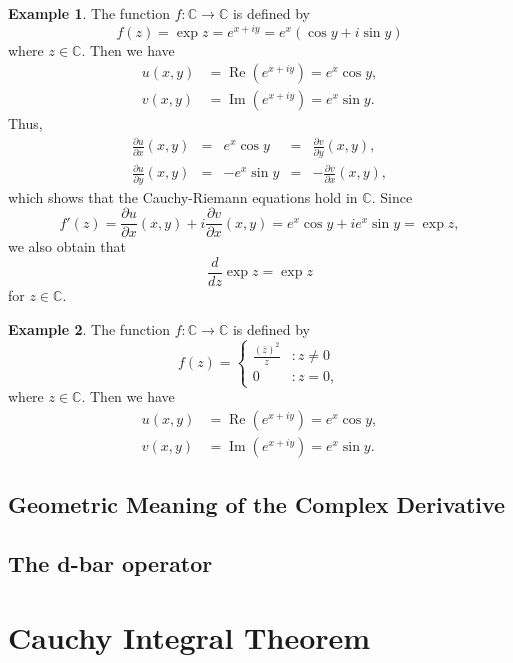 \documentclass[12pt,openany]{book}
\theoremstyle{definition}
\newtheorem{example}{Example}[section]
\newcommand{\C}{\mathbb{C}}
\newcommand{\of}[1]{\left( #1 \right)}
\renewcommand{\Re}{\operatorname{Re}}
\renewcommand{\Im}{\operatorname{Im}}
\begin{document}
	\newpage
	\begin{example}
		The function $f:\C\to\C$ is defined by \[
		f\of{z}=\exp z=e^{x+iy}=e^x\of{\cos y+i\sin y}
		\] where $z\in\C$. Then we have \begin{align*}
		u(x,y)&=\Re\of{e^{x+iy}}=e^x\cos y,\\
		v(x,y)&=\Im\of{e^{x+iy}}=e^x\sin y.
		\end{align*} Thus, \begin{align*}
		\frac{\partial u}{\partial x}\of{x,y} &=& e^x\cos y &=& \frac{\partial v}{\partial y}\of{x,y},\\
		\frac{\partial u}{\partial y}\of{x,y} &=& -e^x\sin y &=& -\frac{\partial v}{\partial x}\of{x,y},
		\end{align*} which shows that the Cauchy-Riemann equations hold in $\C$. Since \[
		f'\of{z}=\frac{\partial u}{\partial x}\of{x,y}+i\frac{\partial v}{\partial x}\of{x,y}=e^x\cos y+ie^x\sin y=\exp z,
		\] we also obtain that \[
		\frac{d}{dz}\exp z=\exp z
		\] for $z\in\C$.
	\end{example}
	
	\begin{example}
		The function $f:\C\to\C$ is defined by \[
		f\of{z}=\begin{cases}
		\displaystyle\frac{\of{\bar{z}}^2}{z} &:z\neq 0\\
		0 &:z=0,
		\end{cases}
		\] where $z\in\C$. Then we have \begin{align*}
		u(x,y)&=\Re\of{e^{x+iy}}=e^x\cos y,\\
		v(x,y)&=\Im\of{e^{x+iy}}=e^x\sin y.
		\end{align*}
	\end{example}
	
	\newpage
	\section{Geometric Meaning of the Complex Derivative}
	
	\newpage
	\section{The d-bar operator}
	
	\newpage
	\chapter{Cauchy Integral Theorem}
	
\end{document}
